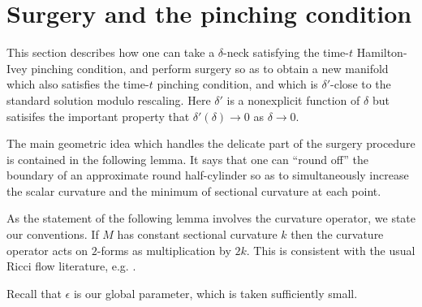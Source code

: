 \documentclass[12pt]{amsart}
\newcommand{\de}{\delta}
\newcommand{\ra}{\rightarrow}
\numberwithin{equation}{section}
\theoremstyle{plain}
\theoremstyle{definition}
\theoremstyle{remark}
\begin{document}
\section{Surgery and the pinching condition} \label{surgery}

This section describes how one can take a $\de$-neck 
satisfying the time-$t$ Hamilton-Ivey pinching condition,
and perform surgery so as to obtain a new manifold which also satisfies
the time-$t$ pinching condition, and which is $\de'$-close to the
standard solution modulo rescaling. 
Here $\de'$ is a nonexplicit function of $\de$ but satisifes the important
property that  $\de'(\de)\ra 0$ as $\de\ra 0$.



The main geometric idea which handles the delicate part of the surgery
procedure is contained in the following lemma.  It says that one can ``round off''
the boundary of an approximate round half-cylinder so as to simultaneously 
increase the scalar curvature  and  the minimum of sectional curvature at each
point.

As the statement of the following lemma involves the curvature
operator, we state our conventions. If $M$ has constant sectional
curvature $k$ then the curvature operator acts on $2$-forms as
multiplication by $2k$.  This is consistent with the usual
Ricci flow literature, e.g. \cite{Chow-Knopf}.

Recall that $\epsilon$ is our global parameter, which is taken
sufficiently small.
\end{document}
